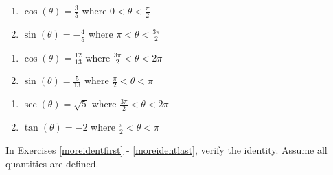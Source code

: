 \begin{multicols}{2}

\begin{enumerate}

\setcounter{enumi}{\value{HW}}

\item  $\cos(\theta) = \frac{3}{5}$ where $0 < \theta < \frac{\pi}{2}$
\item  $\sin(\theta) = -\frac{4}{5}$ where $\pi < \theta < \frac{3\pi}{2}$

\setcounter{HW}{\value{enumi}}

\end{enumerate}

\end{multicols}

\begin{multicols}{2}

\begin{enumerate}

\setcounter{enumi}{\value{HW}}

\item  $\cos(\theta) = \frac{12}{13}$ where $\frac{3\pi}{2} < \theta < 2\pi$
\item  $\sin(\theta) = \frac{5}{13}$ where $\frac{\pi}{2} < \theta < \pi$

\setcounter{HW}{\value{enumi}}

\end{enumerate}

\end{multicols}

\begin{multicols}{2}

\begin{enumerate}

\setcounter{enumi}{\value{HW}}

\item  $\sec(\theta) = \sqrt{5}$ where $\frac{3\pi}{2} < \theta < 2\pi$
\item  $\tan(\theta) = -2$ where $\frac{\pi}{2} < \theta < \pi$ \label{doublehalflast}

\setcounter{HW}{\value{enumi}}

\end{enumerate}

\end{multicols}



In Exercises \ref{moreidentfirst} - \ref{moreidentlast}, verify the identity.  Assume all quantities are defined.

